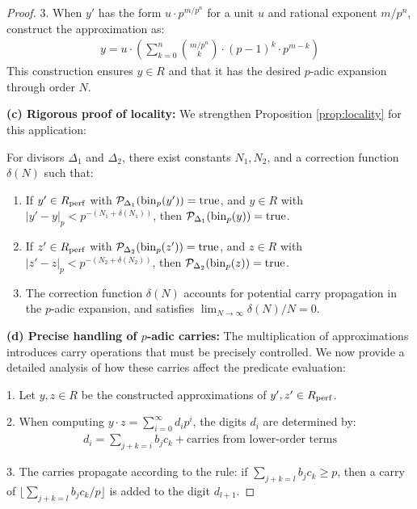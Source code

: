 \begin{proof}
3. When $y'$ has the form $u \cdot p^{m/p^n}$ for a unit $u$ and rational exponent $m/p^n$, construct the approximation as:
\begin{align*}
y = u \cdot \left( \sum_{k=0}^{n} \binom{m/p^n}{k} \cdot (p-1)^k \cdot p^{m-k} \right)
\end{align*}
This construction ensures $y \in R$ and that it has the desired $p$-adic expansion through order $N$.

\textbf{(c) Rigorous proof of locality:} We strengthen Proposition \ref{prop:locality} for this application:

\begin{lemma}\label{lem:enhanced-locality}
For divisors $\Delta_1$ and $\Delta_2$, there exist constants $N_1, N_2$, and a correction function $\delta(N)$ such that:
\begin{enumerate}
    \item If $y' \in R_{\operatorname{perf}}$ with $\mathcal{P}_{\Delta_1}(\operatorname{bin}_p(y')) = \text{true}$, and $y \in R$ with $|y' - y|_p < p^{-(N_1+\delta(N_1))}$, then $\mathcal{P}_{\Delta_1}(\operatorname{bin}_p(y)) = \text{true}$.
    
    \item If $z' \in R_{\operatorname{perf}}$ with $\mathcal{P}_{\Delta_2}(\operatorname{bin}_p(z')) = \text{true}$, and $z \in R$ with $|z' - z|_p < p^{-(N_2+\delta(N_2))}$, then $\mathcal{P}_{\Delta_2}(\operatorname{bin}_p(z)) = \text{true}$.
    
    \item The correction function $\delta(N)$ accounts for potential carry propagation in the $p$-adic expansion, and satisfies $\lim_{N \to \infty} \delta(N)/N = 0$.
\end{enumerate}
\end{lemma}

\textbf{(d) Precise handling of $p$-adic carries:} The multiplication of approximations introduces carry operations that must be precisely controlled. We now provide a detailed analysis of how these carries affect the predicate evaluation:

1. Let $y, z \in R$ be the constructed approximations of $y', z' \in R_{\operatorname{perf}}$.

2. When computing $y \cdot z = \sum_{i=0}^{\infty} d_i p^i$, the digits $d_i$ are determined by:
\begin{align*}
d_i = \sum_{j+k=i} b_j c_k + \text{carries from lower-order terms}
\end{align*}

3. The carries propagate according to the rule: if $\sum_{j+k=l} b_j c_k \geq p$, then a carry of $\lfloor \sum_{j+k=l} b_j c_k / p \rfloor$ is added to the digit $d_{l+1}$.


\end{proof}
